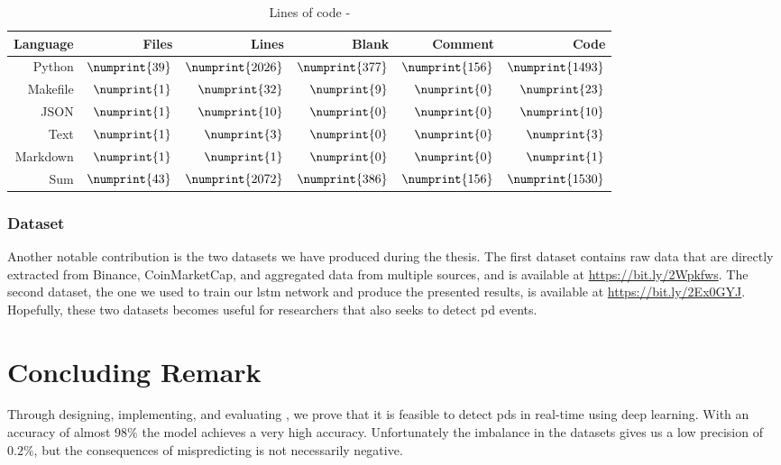 \begin{table}[ht]
        \centering
        \begin{tabularx}{\textwidth}{ |R|R|R|R|R|R| }\hline
        Language    & Files             & Lines             & Blank             & Comment           & Code              \\\hline
        Python      & $\numprint{39}$   & $\numprint{2026}$ & $\numprint{377}$  & $\numprint{156}$  & $\numprint{1493}$ \\
        Makefile    & $\numprint{1}$    & $\numprint{32}$   & $\numprint{9}$    & $\numprint{0}$    & $\numprint{23}$   \\
        JSON        & $\numprint{1}$    & $\numprint{10}$   & $\numprint{0}$    & $\numprint{0}$    & $\numprint{10}$   \\
        Text        & $\numprint{1}$    & $\numprint{3}$    & $\numprint{0}$    & $\numprint{0}$    & $\numprint{3}$    \\
        Markdown    & $\numprint{1}$    & $\numprint{1}$    & $\numprint{0}$    & $\numprint{0}$    & $\numprint{1}$    \\\hline
        Sum         & $\numprint{43}$   & $\numprint{2072}$ & $\numprint{386}$  & $\numprint{156}$  & $\numprint{1530}$ \\\hline
        \end{tabularx}
        \caption{Lines of code - \project}
        \label{tab:cloc_thesis}
\end{table}

\subsubsection{Dataset}
Another notable contribution is the two datasets we have produced during the thesis. The first dataset contains raw data that are directly extracted from Binance, CoinMarketCap, and aggregated data from multiple sources, and is available at \url{https://bit.ly/2Wpkfws}. The second dataset, the one we used to train our \ac{lstm} network and produce the presented results, is available at \url{https://bit.ly/2Ex0GYJ}. Hopefully, these two datasets becomes useful for researchers that also seeks to detect \ac{pd} events.

\section{Concluding Remark}
Through designing, implementing, and evaluating \project, we prove that it is feasible to detect \acp{pd} in real-time using deep learning. With an accuracy of almost $98\%$ the model achieves a very high accuracy. Unfortunately the imbalance in the datasets gives us a low precision of $0.2\%$, but the consequences of mispredicting is not necessarily negative.

